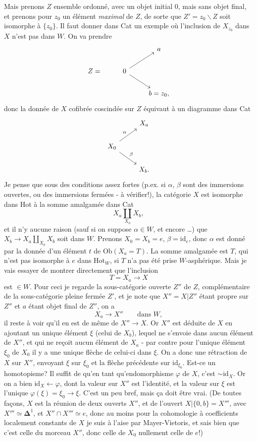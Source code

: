 Mais prenons $Z$ ensemble ordonné, avec un objet initial $0$, mais sans objet final, et prenons pour $z_0$ un élément \textit{maximal} de $Z$, de sorte que $Z' = z_0\backslash Z$ soit isomorphe à $\{z_0\}$. Il faut donner dans Cat un exemple où l'inclusion de $X_{z_0}$ dans $X$ n'est pas dans $W$. On va prendre
\[
\begin{tikzcd}
 & & a \\
Z = & 0 \arrow[ur] \arrow[dr] & \\
 & & b = z_0,
\end{tikzcd}
\]
donc la donnée de $X$ cofibrée coscindée sur $Z$ équivaut à un diagramme dans Cat
\[
\begin{tikzcd}
 & X_a \\
X_0 \arrow[ur, "\alpha"] \arrow[dr, "\beta"] & \\
 & X_b.
\end{tikzcd}
\]
Je pense que sous des conditions assez fortes (p.ex. si $\alpha$, $\beta$ sont des immersions ouvertes, ou des immersions fermées - à vérifier!), la catégorie $X$ est isomorphe dans Hot à la somme amalgamée dans Cat
\[ X_a{\textstyle\coprod_{X_0}}X_b, \]
et il n'y aucune raison (sauf si on suppose $\alpha \in W$, et encore \dots) que $X_b \longrightarrow X_a \coprod_{X_0} X_b$ soit dans $W$. Prenons $X_0 = X_b = e$, $\beta = \mathrm{id}_e$, donc $\alpha$ est donné par la donnée d'un élément $t$ de $\mathrm{Ob}(X_a = T)$. La somme amalgamée est $T$, qui n'est pas isomorphe à $e$ dans $\mathrm{Hot}_W$,
si $T$ n'a pas été prise $W$-asphérique. Mais je vais essayer de montrer directement que l'inclusion
\[ T = X_a \longrightarrow X \]
est $\in W$. Pour ceci je regarde la sous-catégorie ouverte $Z''$ de $Z$, complémentaire de la sous-catégorie pleine fermée $Z'$, et je note que $X'' = X|Z''$ étant propre sur $Z''$ et $a$ étant objet final de $Z''$, on a
\[ X_a \longrightarrow X'' \qquad \text{dans } W, \]
il reste à voir qu'il en est de même de $X'' \longrightarrow X$. Or $X''$ est déduite de $X$ en ajoutant un unique élément $\xi$ (celui de $X_b$), lequel ne s'envoie dans aucun élément de $X''$, et qui ne reçoit aucun élément de $X_a$ - par contre pour l'unique élément $\xi_0$ de $X_0$ il y a une unique flèche de celui-ci dans $\xi$. On a donc une rétraction de $X$ sur $X''$, envoyant $\xi$ sur $\xi_0$ et la flèche précédente sur $\mathrm{id}_{\xi_0}$. Est-ce un homotopisme? Il suffit de qu'en tant qu'endomorphisme $\varphi$ de $X$, c'est $\sim \mathrm{id}_X$. Or on a bien $\mathrm{id}_X \longleftarrow \varphi$, dont la valeur sur $X''$ est l'identité, et la valeur sur $\xi$ est l'unique $\varphi(\xi) = \xi_0 \longrightarrow \xi$. C'est un peu bref, mais ça doit être vrai. (De toutes façons, $X$ est la réunion de deux ouverts $X''$, et de l'ouvert $X|\{0,b\} = X'''$, avec $X''' \simeq \mathbf{\Delta}^1$, et $X'' \cap X''' \simeq e$, donc au moins pour la cohomologie à coefficients localement constants de $X$ je suis à l'aise par Mayer-Vietoris, et sais bien que c'est celle du morceau $X''$, donc celle de $X_0$ nullement celle de $e$!)

